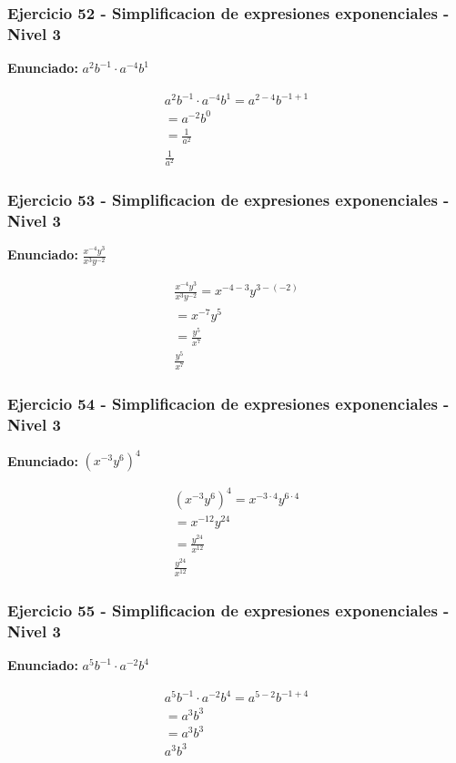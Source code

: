 \documentclass[12pt,a4paper]{article}
\begin{document}
\subsubsection*{Ejercicio 52 - Simplificacion de expresiones exponenciales - Nivel 3}
\textbf{Enunciado:} \(a^{2}b^{-1}\cdot a^{-4}b^{1}\)

\[
\begin{aligned}
a^{2}b^{-1}\cdot a^{-4}b^{1}=a^{2-4}b^{-1+1}\\
=a^{-2}b^{0}\\
=\frac{1}{a^{2}}\\
\boxed{\frac{1}{a^{2}}}
\end{aligned}
\]


\subsubsection*{Ejercicio 53 - Simplificacion de expresiones exponenciales - Nivel 3}
\textbf{Enunciado:} \(\frac{x^{-4}y^{3}}{x^{3}y^{-2}}\)

\[
\begin{aligned}
\frac{x^{-4}y^{3}}{x^{3}y^{-2}}=x^{-4-3}y^{3-(-2)}\\
=x^{-7}y^{5}\\
=\frac{y^{5}}{x^{7}}\\
\boxed{\frac{y^{5}}{x^{7}}}
\end{aligned}
\]


\subsubsection*{Ejercicio 54 - Simplificacion de expresiones exponenciales - Nivel 3}
\textbf{Enunciado:} \(\left(x^{-3}y^{6}\right)^{4}\)

\[
\begin{aligned}
\left(x^{-3}y^{6}\right)^{4}=x^{-3\cdot 4}y^{6\cdot 4}\\
=x^{-12}y^{24}\\
=\frac{y^{24}}{x^{12}}\\
\boxed{\frac{y^{24}}{x^{12}}}
\end{aligned}
\]


\subsubsection*{Ejercicio 55 - Simplificacion de expresiones exponenciales - Nivel 3}
\textbf{Enunciado:} \(a^{5}b^{-1}\cdot a^{-2}b^{4}\)

\[
\begin{aligned}
a^{5}b^{-1}\cdot a^{-2}b^{4}=a^{5-2}b^{-1+4}\\
=a^{3}b^{3}\\
=a^{3}b^{3}\\
\boxed{a^{3}b^{3}}
\end{aligned}
\]
\end{document}
